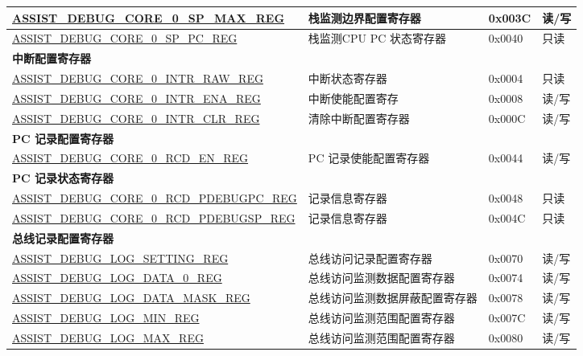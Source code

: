 \begin{longtable}{ | l| m{3.2cm} | l | l | }
\hyperref[regdesc:ASSISTDEBUGCORE0SPMAXREG]{ASSIST\_DEBUG\_CORE\_0\_SP\_MAX\_REG} & 栈监测边界配置寄存器 & 0x003C &读/写 \\ \hline
\hyperref[regdesc:ASSISTDEBUGCORE0SPPCREG]{ASSIST\_DEBUG\_CORE\_0\_SP\_PC\_REG} & 栈监测CPU PC 状态寄存器 & 0x0040 & 只读 \\ \hline
\multicolumn{4}{|l|}{\textbf{中断配置寄存器}} \\ \hline
\hyperref[regdesc:ASSISTDEBUGCORE0INTRRAWREG]{ASSIST\_DEBUG\_CORE\_0\_INTR\_RAW\_REG} & 中断状态寄存器 & 0x0004 & 只读 \\ \hline
\hyperref[regdesc:ASSISTDEBUGCORE0INTRENAREG]{ASSIST\_DEBUG\_CORE\_0\_INTR\_ENA\_REG} & 中断使能配置寄存 & 0x0008 & 读/写 \\ \hline
\hyperref[regdesc:ASSISTDEBUGCORE0INTRCLRREG]{ASSIST\_DEBUG\_CORE\_0\_INTR\_CLR\_REG} & 清除中断配置寄存器 & 0x000C & 读/写 \\ \hline
\multicolumn{4}{|l|}{\textbf{PC 记录配置寄存器}} \\ \hline
\hyperref[regdesc:ASSISTDEBUGCORE0RCDENREG]{ASSIST\_DEBUG\_CORE\_0\_RCD\_EN\_REG} & PC 记录使能配置寄存器 & 0x0044 &读/写 \\ \hline
\multicolumn{4}{|l|}{\textbf{PC 记录状态寄存器}} \\ \hline
\hyperref[regdesc:ASSISTDEBUGCORE0RCDPDEBUGPCREG]{ASSIST\_DEBUG\_CORE\_0\_RCD\_PDEBUGPC\_REG} & 记录信息寄存器 & 0x0048 & 只读 \\ \hline
\hyperref[regdesc:ASSISTDEBUGCORE0RCDPDEBUGSPREG]{ASSIST\_DEBUG\_CORE\_0\_RCD\_PDEBUGSP\_REG} & 记录信息寄存器 & 0x004C & 只读 \\ \hline
\multicolumn{4}{|l|}{\textbf{总线记录配置寄存器}} \\ \hline
\hyperref[regdesc:ASSISTDEBUGLOGSETTINGREG]{ASSIST\_DEBUG\_LOG\_SETTING\_REG} & 总线访问记录配置寄存器 & 0x0070 & 读/写 \\ \hline
\hyperref[regdesc:ASSISTDEBUGLOGDATA0REG]{ASSIST\_DEBUG\_LOG\_DATA\_0\_REG} & 总线访问监测数据配置寄存器 & 0x0074 & 读/写 \\ \hline
\hyperref[regdesc:ASSISTDEBUGLOGDATAMASKREG]{ASSIST\_DEBUG\_LOG\_DATA\_MASK\_REG} & 总线访问监测数据屏蔽配置寄存器 & 0x0078 & 读/写 \\ \hline
\hyperref[regdesc:ASSISTDEBUGLOGMINREG]{ASSIST\_DEBUG\_LOG\_MIN\_REG} & 总线访问监测范围配置寄存器 & 0x007C & 读/写 \\ \hline
\hyperref[regdesc:ASSISTDEBUGLOGMAXREG]{ASSIST\_DEBUG\_LOG\_MAX\_REG} & 总线访问监测范围配置寄存器 & 0x0080 & 读/写 \\ \hline

\end{longtable}
